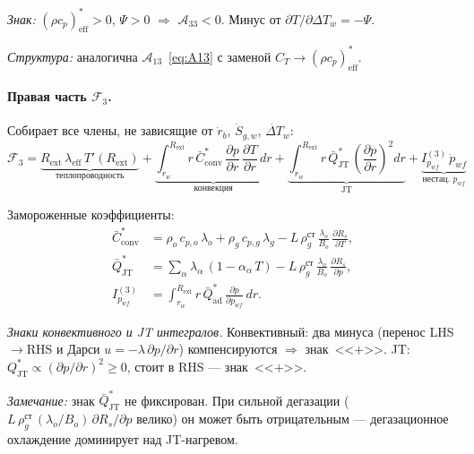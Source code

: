 \documentclass[12pt,a4paper]{article}
\begin{document}
\emph{Знак:}
$(\rho c_p)_{\text{eff}}^{*} > 0$, $\Psi > 0$
$\Rightarrow$ $\mathcal{A}_{33} < 0$.
Минус от $\partial T/\partial\Delta T_w = -\Psi$.

\emph{Структура:} аналогична $\mathcal{A}_{13}$~\eqref{eq:A13}
с заменой $C_T \to (\rho c_p)_{\text{eff}}^{*}$.

\paragraph{Правая часть $\mathcal{F}_3$.}

Собирает все члены, не зависящие от
$\dot{r}_b$, $\dot{S}_{g,w}$, $\dot{\Delta T}_w$:
\begin{equation}\label{eq:F3}
  \boxed{
    \mathcal{F}_3
    = \underbrace{R_{\text{ext}}\,\lambda_{\text{eff}}\,T'(R_{\text{ext}})}_{
        \text{теплопроводность}}
    + \underbrace{\int_{r_w}^{R_{\text{ext}}} r\,\bar{C}_{\text{conv}}^{*}\,
      \frac{\partial p}{\partial r}\,\frac{\partial T}{\partial r}\,dr}_{
        \text{конвекция}}
    + \underbrace{\int_{r_w}^{R_{\text{ext}}} r\,\bar{Q}_{\text{JT}}^{*}\,
      \left(\frac{\partial p}{\partial r}\right)^{\!2} dr}_{
        \text{JT}}
    + \underbrace{I_{p_{wf}}^{(3)}\,\dot{p}_{wf}}_{
        \text{нестац.\ }p_{wf}}
  }
\end{equation}

Замороженные коэффициенты:
\begin{align}
  \bar{C}_{\text{conv}}^{*}
    &= \rho_o\,c_{p,o}\,\lambda_o + \rho_g\,c_{p,g}\,\lambda_g
       - L\,\rho_g^{\text{ст}}\,\frac{\lambda_o}{B_o}\,
         \frac{\partial R_s}{\partial T},
  \label{eq:Cconv_star}\\[4pt]
  \bar{Q}_{\text{JT}}^{*}
    &= \sum_\alpha \lambda_\alpha\,(1 - \alpha_\alpha\,T)
       - L\,\rho_g^{\text{ст}}\,\frac{\lambda_o}{B_o}\,
         \frac{\partial R_s}{\partial p},
  \label{eq:QJT_star_coeff}\\[4pt]
  I_{p_{wf}}^{(3)}
    &= \int_{r_w}^{R_{\text{ext}}} r\,\bar{Q}_{\text{ad}}^{*}\,
       \frac{\partial p}{\partial p_{wf}}\,dr.
  \label{eq:I_pwf_energy}
\end{align}

\emph{Знаки конвективного и JT интегралов.}
Конвективный: два минуса (перенос LHS$\to$RHS
и Дарси $u = -\lambda\,\partial p/\partial r$) компенсируются
$\Rightarrow$ знак~<<$+$>>.
JT: $Q_{\text{JT}}^* \propto (\partial p/\partial r)^2 \geq 0$,
стоит в RHS --- знак~<<$+$>>.

\emph{Замечание:} знак $\bar{Q}_{\text{JT}}^{*}$ не фиксирован.
При сильной дегазации ($L\,\rho_g^{\text{ст}}\,(\lambda_o/B_o)\,
\partial R_s/\partial p$ велико) он может быть отрицательным ---
дегазационное охлаждение доминирует над JT-нагревом.
\end{document}

